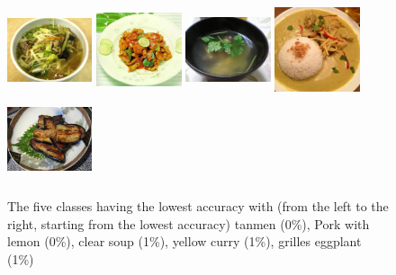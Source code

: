 \begin{figure}
    \centering
    \includegraphics[height=2.5cm, width=2.5cm]{img/least_tanmen.jpg}
    \includegraphics[height=2.5cm, width=2.5cm]{img/least_pork_with_lemon.jpg}
    \includegraphics[height=2.5cm, width=2.5cm]{img/least_clear_soup.jpg}
    \includegraphics[height=2.5cm, width=2.5cm]{img/least_yellow_curry.jpg}
    \includegraphics[height=2.5cm, width=2.5cm]{img/least_grilled_eggplant.jpg}
    \caption[Classes having the lowest accuracy]{The five classes having the lowest accuracy with (from the left to the right, starting from the lowest accuracy) tanmen (0\%), Pork with lemon (0\%), clear soup (1\%), yellow curry (1\%), grilles eggplant (1\%)}
    \label{fig:least_5}
\end{figure}


